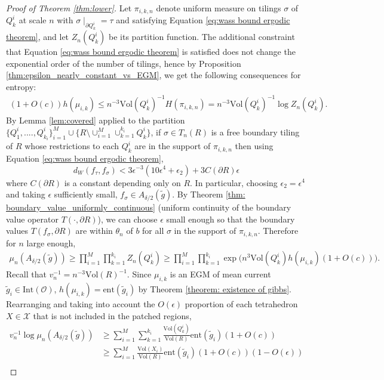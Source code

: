 \documentclass[11pt]{article}
\theoremstyle{remark}
\theoremstyle{definition}
\newcommand{\ent}{\text{ent}}
\newcommand{\mc}[1]{\mathcal{#1}}
\newcommand{\Vol}{\text{Vol}}
\begin{document}
\begin{proof}[Proof of Theorem \ref{thm:lower}]
Let $\pi_{i,k,n}$ denote uniform measure on tilings $\sigma$ of $Q_k^i$ at scale $n$ with $\sigma\mid_{\partial Q_k^i} = \tau$ and satisfying Equation \eqref{eq:wass bound ergodic theorem}, and let $Z_n(Q_k^i)$ be its partition function. The additional constraint that Equation \eqref{eq:wass bound ergodic theorem} is satisfied does not change the exponential order of the number of tilings, hence by Proposition \ref{thm:epsilon_nearly_constant_vs_EGM}, we get the following consequences for entropy:
\begin{align*}
    (1+O(c)) h(\mu_{i,k}) \leq n^{-3} \Vol(Q_{k}^i)^{-1} H(\pi_{i,k,n}) = n^{-3}\Vol(Q_k^i)^{-1} \log Z_n(Q_k^i). 
\end{align*}
By Lemma \ref{lem:covered} applied to the partition $\{Q_1^i,....,Q_{k_i}^i\}_{i=1}^M\cup \{R\setminus \cup_{i=1}^M \cup_{k=1}^{k_i} Q_k^i\}$, if $\sigma\in T_n(R)$ is a free boundary tiling of $R$ whose restrictions to each $Q_{k}^i$ are in the support of $\pi_{i,k,n}$ then using Equation \eqref{eq:wass bound ergodic theorem},
$$d_W( f_\tau,  f_\sigma) < 3 \epsilon^{-3}(10 \epsilon^4 + \epsilon_2) + 3 C(\partial R) \epsilon$$
where $C(\partial R)$ is a constant depending only on $R$. In particular, choosing $\epsilon_2=\epsilon^4$ and taking $\epsilon$ sufficiently small, $f_\sigma \in A_{\delta/2}(\widetilde g)$. By Theorem \ref{thm: boundary_value_uniformly_continuous} (uniform continuity of the boundary value operator $T(\cdot,\partial R)$), we can choose $\epsilon$ small enough so that the boundary values $T(f_\sigma,\partial R)$ are within $\theta_n$ of $b$ for all $\sigma$ in the support of $\pi_{i,k,n}$. Therefore for $n$ large enough, 
\begin{align*}
    \mu_n(A_{\delta/2}(\widetilde g)) \geq \prod_{i=1}^M \prod_{k=1}^{k_i} Z_n(Q_k^i) \geq \prod_{i=1}^M \prod_{k=1}^{k_i} \exp\bigg( n^3 \Vol(Q_k^i) h(\mu_{i,k}) (1+O(c))\bigg).
\end{align*}
Recall that $v_n^{-1} = n^{-3} \Vol(R)^{-1}$. Since $\mu_{i,k}$ is an EGM of mean current $\widetilde g_i\in \text{Int}(\mc O)$, $h(\mu_{i,k}) = \ent(\widetilde g_i)$ by Theorem \ref{theorem: existence of gibbs}. Rearranging and taking into account the $O(\epsilon)$ proportion of each tetrahedron $X\in \mc X$ that is not included in the patched regions, 
\begin{align*}
    v_n^{-1}\log \mu_n(A_{\delta/2}(\widetilde g)) &\geq \sum_{i=1}^M \sum_{k=1}^{k_i} \frac{\Vol(Q_k^i)}{\Vol(R)} \ent(\widetilde g_i) (1+O(c)) \\ &\geq \sum_{i=1}^M \frac{\Vol(X_i)}{\Vol(R)} \ent(\widetilde g_i) (1+ O(c))(1-O(\epsilon))\\

\end{align*}
\end{proof}
\end{document}
